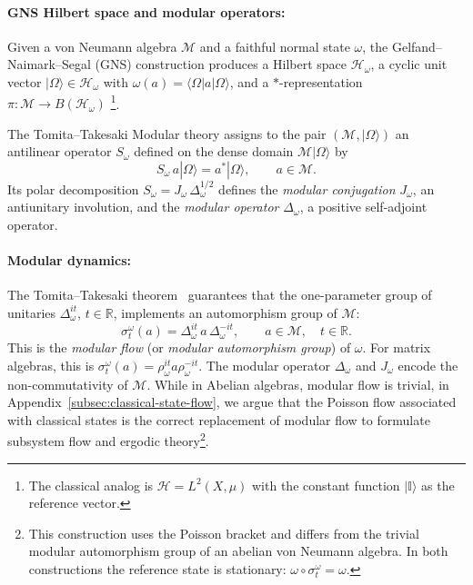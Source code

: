 \documentclass[a4paper,11pt]{article}
\theoremstyle{definition}
\newcommand{\id}{\mathbb{I}}
\newcommand{\mM}{\mathcal{M}}
\begin{document}
\paragraph{GNS Hilbert space and modular operators:}
Given a von Neumann algebra $\mM$ and a faithful normal state $\omega$, the
Gelfand--Naimark--Segal (GNS) construction produces a Hilbert space $\mathcal{H}_\omega$,
a cyclic unit vector $|\Omega\rangle\in\mathcal{H}_\omega$ with
$\omega(a)=\langle\Omega|a|\Omega\rangle$, and a $*$-representation
$\pi:\mM\to B(\mathcal{H}_\omega)$ \footnote{The classical analog is $\mathcal{H}=L^2(X,\mu)$
with the constant function $|\id\rangle$ as the reference vector.}.

The Tomita--Takesaki Modular theory assigns to the pair $(\mM,|\Omega\rangle)$ an
antilinear operator $S_\omega$ defined on the dense domain
$\mM|\Omega\rangle$ by
\begin{equation}
  S_\omega\, a|\Omega\rangle = a^*|\Omega\rangle, \qquad a\in\mM.
  \label{eq:Tomita-S}
\end{equation}
Its polar decomposition $S_\omega = J_\omega\,\Delta_\omega^{1/2}$ defines the
\emph{modular conjugation} $J_\omega$, an antiunitary involution, and the
\emph{modular operator} $\Delta_\omega$, a positive self-adjoint operator. 

\paragraph{Modular dynamics:}
The Tomita--Takesaki theorem~\cite{Takesaki1970} guarantees that the one-parameter group
of unitaries $\Delta_\omega^{it}$, $t\in\mathbb{R}$, implements an automorphism group of
$\mM$:
\begin{equation}
  \sigma_t^\omega(a) = \Delta_\omega^{it}\, a\, \Delta_\omega^{-it},
  \qquad a\in\mM,\quad t\in\mathbb{R}.
  \label{eq:modular-flow}
\end{equation}
This is the \emph{modular flow} (or \emph{modular automorphism group}) of $\omega$.
For matrix algebras, this is $\sigma^{\omega}_t(a)=\rho_\omega^{it}a\rho_\omega^{-it}$.
The modular operator $\Delta_\omega$ and $J_\omega$ encode the non-commutativity of
$\mM$. While in Abelian algebras, modular flow is trivial, in Appendix~\ref{subsec:classical-state-flow}, we argue that the
Poisson flow associated with classical states is the correct replacement of modular flow to formulate subsystem flow and ergodic theory\footnote{This construction uses
the Poisson bracket and differs from the trivial modular automorphism group of
an abelian von Neumann algebra. In both constructions the reference state is stationary:
$\omega\circ\sigma_t^\omega=\omega$.}.
\end{document}
